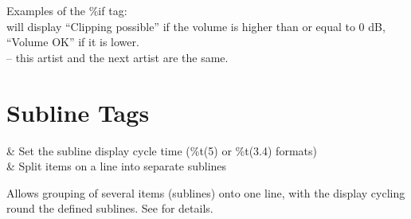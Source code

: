 Examples of the \%if tag:\\

 will display ``Clipping
  possible'' if the volume is higher than or equal to 0 dB, ``Volume OK'' if it
  is lower.\\

 -- this artist and the next artist
  are the same.\\


\section{Subline Tags}

\begin{tagmap}
    & Set the subline display cycle time (\%t(5) or \%t(3.4) formats) \\
\config{;}
    & Split items on a line into separate sublines \\
\end{tagmap}

Allows grouping of several items (sublines) onto one line, with the
display cycling round the defined sublines. See
 for details. 


